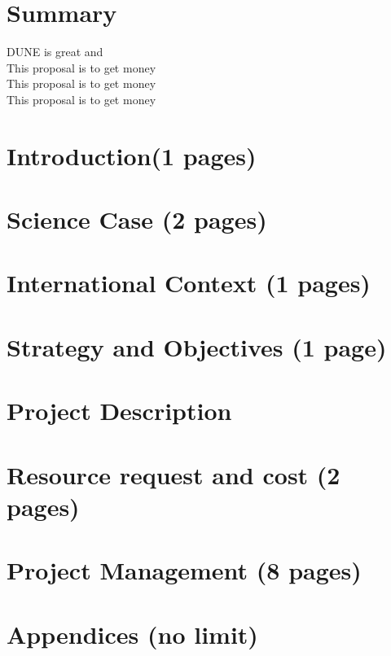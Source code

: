 \documentclass[a4paper,11pt]{article}
\begin{document}
\section*{Summary}
DUNE is great and\\
This proposal is to get money\\
This proposal is to get money\\
This proposal is to get money
\thispagestyle{empty}

\newpage
\thispagestyle{empty}
\setcounter{page}{1}

\setcounter{tocdepth}{2}
\tableofcontents
\newpage


\section{Introduction(1 pages)} 


\section{Science Case (2 pages)}


\section{International Context (1 pages)}


\section{Strategy and Objectives (1 page)}


\section{Project Description}





\section{Resource request and cost (2 pages)}

%
\section{Project Management (8 pages)}


\printbibliography
\clearpage


\appendix
\section*{Appendices (no limit)}
\renewcommand{\thesubsection}{\Alph{subsection}}


\end{document}
